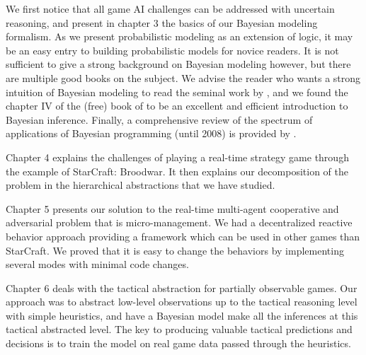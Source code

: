 We first notice that all game AI challenges can be addressed with uncertain reasoning, and present in chapter 3 the basics of our Bayesian modeling formalism. As we present probabilistic modeling as an extension of logic, it may be an easy entry to building probabilistic models for novice readers. It is not sufficient to give a strong background on Bayesian modeling however, but there are multiple good books on the subject. We advise the reader who wants a strong intuition of Bayesian modeling to read the seminal work by \cite{Jaynes}, and we found the chapter IV of the (free) book of \cite{MacKay} to be an excellent and efficient introduction to Bayesian inference. Finally, a comprehensive review of the spectrum of applications of Bayesian programming (until 2008) is provided by \citep{PRDMSMS}.

Chapter 4 explains the challenges of playing a real-time strategy game through the example of StarCraft: Broodwar. It then explains our decomposition of the problem in the hierarchical abstractions that we have studied.

Chapter 5 presents our solution to the real-time multi-agent cooperative and adversarial problem that is micro-management. We had a decentralized reactive behavior approach providing a framework which can be used in other games than StarCraft. We proved that it is easy to change the behaviors by implementing several modes with minimal code changes.

Chapter 6 deals with the tactical abstraction for partially observable games. Our approach was to abstract low-level observations up to the tactical reasoning level with simple heuristics, and have a Bayesian model make all the inferences at this tactical abstracted level. The key to producing valuable tactical predictions and decisions is to train the model on real game data passed through the heuristics.

